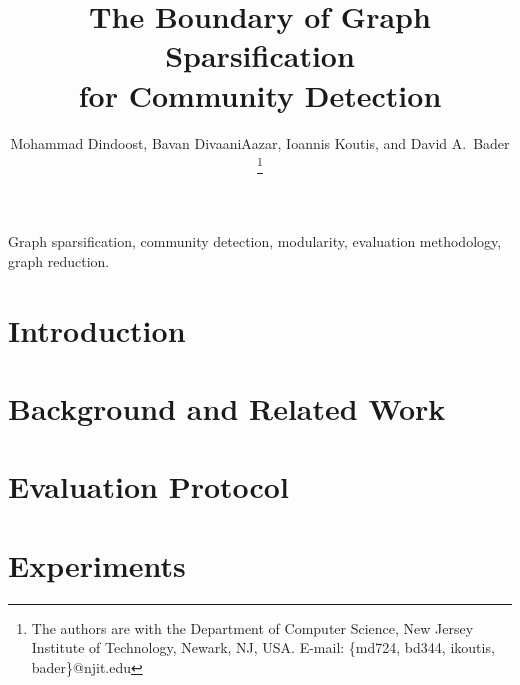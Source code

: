 \documentclass[journal]{IEEEtran}
\theoremstyle{definition}
\theoremstyle{remark}
\begin{document}
\title{The Boundary of Graph Sparsification\\for Community Detection}

\author{Mohammad Dindoost, Bavan DivaaniAazar, Ioannis Koutis, and David A.~Bader%
\thanks{The authors are with the Department of Computer Science,
New Jersey Institute of Technology, Newark, NJ, USA.
E-mail: \{md724, bd344, ikoutis, bader\}@njit.edu}}

\maketitle

%
%
\begin{abstract}
\end{abstract}

\begin{IEEEkeywords}
Graph sparsification, community detection, modularity, evaluation methodology,
graph reduction.
\end{IEEEkeywords}

%
\section{Introduction}\label{sec:intro}


%
%

\section{Background and Related Work}\label{sec:background}


\section{Evaluation Protocol}\label{sec:protocol}


\section{Experiments}\label{sec:experiments}





\end{document}
